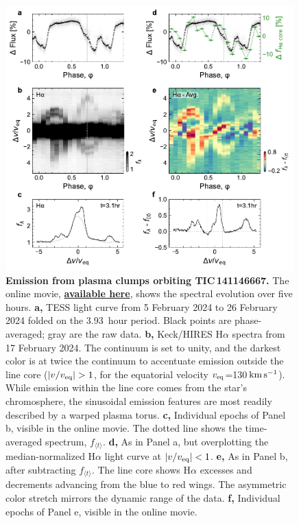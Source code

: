\documentclass[11pt,twocolumn,tighten,linenumbers]{aastex7}
\newcommand{\kms}{\ensuremath{\rm km\,s^{-1}}}
\begin{document}
\begin{figure}[!t]
  \centering
  \includegraphics[width=0.99\textwidth]{f3.pdf}
  \vspace{-0.3cm}
  \captionsetup{labelformat=moviefmt,labelsep=colon}
	\caption{\textbf{Emission from plasma clumps orbiting
TIC\,141146667.}
  The online movie,
  \href{https://lgbouma.com/movies/TIC141146667_sixpanel.mp4}{{\bf
  available here}},
  shows the spectral evolution over five hours.
  {\bf a,} TESS light curve from 5 February 2024 to 26
  February 2024 folded on the 3.93\ hour period.  Black
  points are phase-averaged; gray are the raw data.
  {\bf b,} Keck/HIRES H$\alpha$ spectra from 17 February 2024.
  The continuum is set to unity, and the darkest color is at twice the
  continuum to accentuate emission outside the line core ($|v/v_{\rm
  eq}|>1$, for the equatorial velocity $v_{\rm eq}$=130\,\kms).  While
  emission within the line core comes from the star's chromosphere, the
  sinusoidal emission features are most readily described by a warped
  plasma torus.
  {\bf c,} Individual epochs of Panel b, visible in the online movie.
  The dotted line shows the time-averaged spectrum, $f_{\langle t
  \rangle}$.
  {\bf d,} As in Panel a, but overplotting the
  median-normalized H$\alpha$ light curve at $|v/v_{\rm eq}|<1$.
  {\bf e,} As in Panel b, after subtracting $f_{\langle t
  \rangle}$.  The line core shows H$\alpha$ excesses and decrements
  advancing from the blue to red wings.
  The asymmetric color stretch mirrors the dynamic range of the data.
  {\bf f,} Individual epochs of Panel e, visible in the online
  movie.  }
  \label{fig:spec}
\end{figure}
\end{document}
